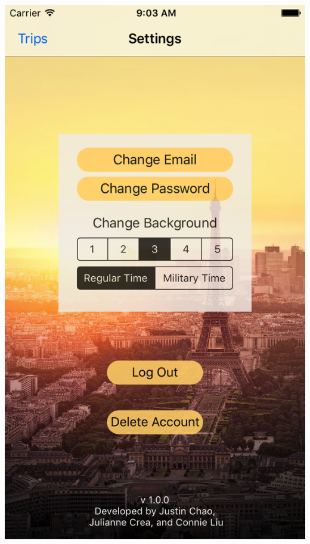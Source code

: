 \documentclass{beamer}
\begin{document}
\begin{frame}
\begin{columns}
\begin{column}{0.3\textwidth}
        \begin{center}
            \includegraphics[scale=0.14]{settings3}
        \end{center}
    \end{column}
\end{columns}
\end{frame}
\end{document}
